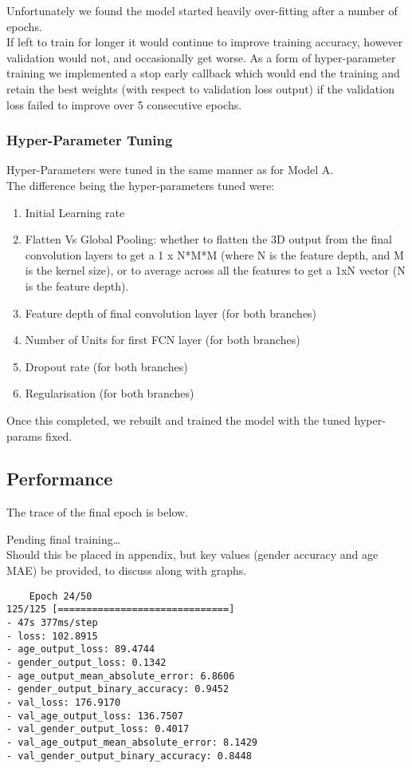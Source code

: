 Unfortunately we found the model started heavily over-fitting after a number of epochs.\\
If left to train for longer it would continue to improve training accuracy, however validation would not, and occasionally get worse.
As a form of hyper-parameter training we implemented a stop early callback which would end the training and retain the best weights (with respect to validation loss output) if the validation loss failed to improve over 5 consecutive epochs.

\begin{optional}
    \subsubsection{Hyper-Parameter Tuning}
    Hyper-Parameters were tuned in the same manner as for Model A.\\
    The difference being the hyper-parameters tuned were:
    \begin{enumerate}
        \item Initial Learning rate
        \item Flatten Vs Global Pooling: whether to flatten the 3D output from the final convolution layers to get a 1 x N*M*M (where N is the feature depth, and M is the kernel size), or to average across all the features to get a 1xN vector (N is the feature depth).
        \item Feature depth of final convolution layer (for both branches)
        \item Number of Units for first FCN layer (for both branches)
        \item Dropout rate (for both branches)
        \item Regularisation (for both branches)
    \end{enumerate}
    Once this completed, we rebuilt and trained the model with the tuned hyper-params fixed.
\end{optional}

\subsection{Performance}
The trace of the final epoch is below.
\begin{notes}
    Pending final training\dots\\
    Should this be placed in appendix, but key values (gender accuracy and age MAE) be provided, to discuss along with graphs.
\end{notes}
\begin{verbatim}
    Epoch 24/50
125/125 [==============================] 
- 47s 377ms/step 
- loss: 102.8915 
- age_output_loss: 89.4744 
- gender_output_loss: 0.1342 
- age_output_mean_absolute_error: 6.8606 
- gender_output_binary_accuracy: 0.9452 
- val_loss: 176.9170 
- val_age_output_loss: 136.7507 
- val_gender_output_loss: 0.4017 
- val_age_output_mean_absolute_error: 8.1429 
- val_gender_output_binary_accuracy: 0.8448
\end{verbatim}

